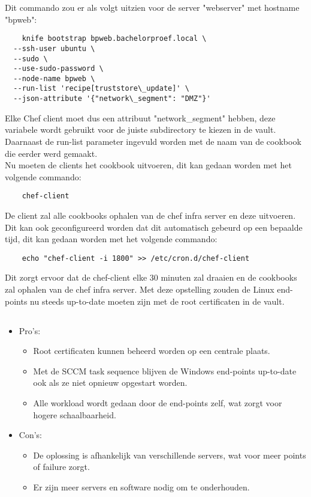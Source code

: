 Dit commando zou er als volgt uitzien voor de server "webserver" met hostname "bpweb":
\begin{verbatim}
    knife bootstrap bpweb.bachelorproef.local \
  --ssh-user ubuntu \
  --sudo \
  --use-sudo-password \
  --node-name bpweb \
  --run-list 'recipe[truststore\_update]' \
  --json-attribute '{"network\_segment": "DMZ"}'
\end{verbatim}

Elke Chef client moet dus een attribuut "network\_segment" hebben, deze variabele wordt gebruikt voor de juiste subdirectory te kiezen in de vault. Daarnaast de run-list parameter ingevuld worden met de naam van de cookbook die eerder werd gemaakt. \\

Nu moeten de clients het cookbook uitvoeren, dit kan gedaan worden met het volgende commando:
\begin{verbatim}
    chef-client
\end{verbatim} 

De client zal alle cookbooks ophalen van de chef infra server en deze uitvoeren. Dit kan ook geconfigureerd worden dat dit automatisch gebeurd op een bepaalde tijd, dit kan gedaan worden met het volgende commando:
\begin{verbatim}
    echo "chef-client -i 1800" >> /etc/cron.d/chef-client
\end{verbatim}

Dit zorgt ervoor dat de chef-client elke 30 minuten zal draaien en de cookbooks zal ophalen van de chef infra server.
Met deze opstelling zouden de Linux end-points nu steeds up-to-date moeten zijn met de root certificaten in de vault. \\

\subsection{}
\label{subsec:Pros_en_Cons_van_de_tweede_oplossing}

\begin{itemize}
    \item Pro's:
    \begin{itemize}
        \item Root certificaten kunnen beheerd worden op een centrale plaats.
        \item Met de SCCM task sequence blijven de Windows end-points up-to-date ook als ze niet opnieuw opgestart worden.
        \item Alle workload wordt gedaan door de end-points zelf, wat zorgt voor hogere schaalbaarheid.
    \end{itemize}
    \item Con's:
    \begin{itemize}
        \item De oplossing is afhankelijk van verschillende servers, wat voor meer points of failure zorgt.
        \item Er zijn meer servers en software nodig om te onderhouden.
    \end{itemize}
\end{itemize}

